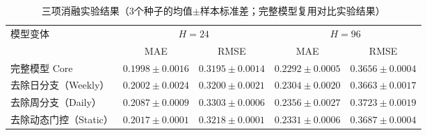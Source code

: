 \begin{table}[t]
\centering
\caption{三项消融实验结果（3个种子的均值$\pm$样本标准差；完整模型复用对比实验结果）}
\label{tab:ablation}
\vspace{4pt}
\small\setlength{\tabcolsep}{7pt}
\begin{tabular}{lcccc}\toprule
模型变体 & \multicolumn{2}{c}{$H=24$} & \multicolumn{2}{c}{$H=96$}\\
\cmidrule(lr){2-3}\cmidrule(lr){4-5}
 & MAE & RMSE & MAE & RMSE\\\midrule
完整模型 Core & $\mathbf{0.1998\pm0.0016}$ & $\mathbf{0.3195\pm0.0014}$ & $\mathbf{0.2292\pm0.0005}$ & $\mathbf{0.3656\pm0.0004}$\\
去除日分支（Weekly） & $0.2002\pm0.0024$ & $0.3200\pm0.0021$ & $0.2304\pm0.0020$ & $0.3663\pm0.0017$\\
去除周分支（Daily） & $0.2087\pm0.0009$ & $0.3303\pm0.0006$ & $0.2356\pm0.0027$ & $0.3723\pm0.0019$\\
去除动态门控（Static） & $0.2017\pm0.0001$ & $0.3218\pm0.0001$ & $0.2331\pm0.0006$ & $0.3687\pm0.0004$\\
\bottomrule\end{tabular}
\end{table}